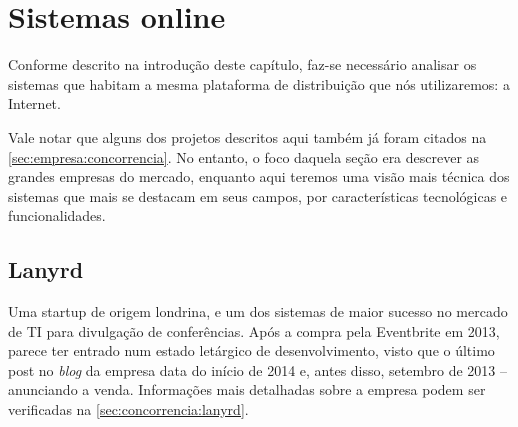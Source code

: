 \documentclass[12pt,a4paper,twoside,hyphens,english,brazil]{abntex2}
\begin{document}
\section{Sistemas online} \label{sec:sistemas:online}
Conforme descrito na introdução deste capítulo, faz-se necessário analisar os sistemas que habitam a mesma plataforma de distribuição que nós utilizaremos: a Internet.

Vale notar que alguns dos projetos descritos aqui também já foram citados na \autoref{sec:empresa:concorrencia}. No entanto, o foco daquela seção era descrever as grandes empresas do mercado, enquanto aqui teremos uma visão mais técnica dos sistemas que mais se destacam em seus campos, por características tecnológicas e funcionalidades.

\subsection{Lanyrd}
Uma startup de origem londrina, e um dos sistemas de maior sucesso no mercado de TI para divulgação de conferências. Após a compra pela Eventbrite em 2013, parece ter entrado num estado letárgico de desenvolvimento, visto que o último post no \emph{blog} da empresa data do início de 2014 e, antes disso, setembro de 2013 -- anunciando a venda. Informações mais detalhadas sobre a empresa podem ser verificadas na \autoref{sec:concorrencia:lanyrd}.
\end{document}
